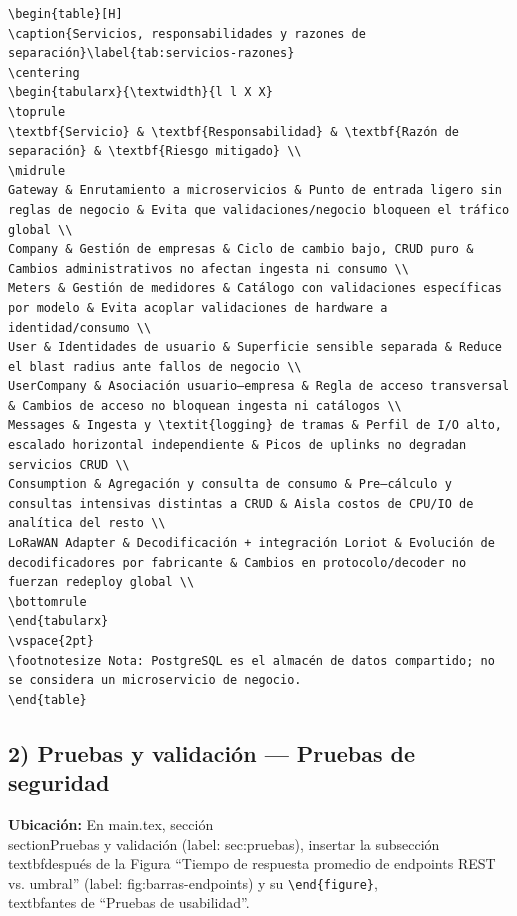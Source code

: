 \begin{verbatim}
\begin{table}[H]
\caption{Servicios, responsabilidades y razones de separación}\label{tab:servicios-razones}
\centering
\begin{tabularx}{\textwidth}{l l X X}
\toprule
\textbf{Servicio} & \textbf{Responsabilidad} & \textbf{Razón de separación} & \textbf{Riesgo mitigado} \\
\midrule
Gateway & Enrutamiento a microservicios & Punto de entrada ligero sin reglas de negocio & Evita que validaciones/negocio bloqueen el tráfico global \\
Company & Gestión de empresas & Ciclo de cambio bajo, CRUD puro & Cambios administrativos no afectan ingesta ni consumo \\
Meters & Gestión de medidores & Catálogo con validaciones específicas por modelo & Evita acoplar validaciones de hardware a identidad/consumo \\
User & Identidades de usuario & Superficie sensible separada & Reduce el blast radius ante fallos de negocio \\
UserCompany & Asociación usuario–empresa & Regla de acceso transversal & Cambios de acceso no bloquean ingesta ni catálogos \\
Messages & Ingesta y \textit{logging} de tramas & Perfil de I/O alto, escalado horizontal independiente & Picos de uplinks no degradan servicios CRUD \\
Consumption & Agregación y consulta de consumo & Pre–cálculo y consultas intensivas distintas a CRUD & Aisla costos de CPU/IO de analítica del resto \\
LoRaWAN Adapter & Decodificación + integración Loriot & Evolución de decodificadores por fabricante & Cambios en protocolo/decoder no fuerzan redeploy global \\
\bottomrule
\end{tabularx}
\vspace{2pt}
\footnotesize Nota: PostgreSQL es el almacén de datos compartido; no se considera un microservicio de negocio.
\end{table}
\end{verbatim}

\subsection*{2) Pruebas y validación — Pruebas de seguridad}

\textbf{Ubicación:} En main.tex, sección \\section{Pruebas y validación} (label: sec:pruebas), insertar la subsección \\textbf{después} de la Figura ``Tiempo de respuesta promedio de endpoints REST vs. umbral'' (label: fig:barras-endpoints) y su \verb|\end{figure}|, \\textbf{antes} de ``Pruebas de usabilidad''.

